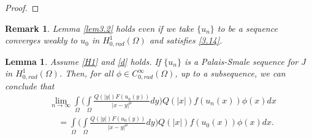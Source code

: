 \documentclass[11pt]{amsart}
\numberwithin{equation}{section}
\newtheorem{lem}[thm]{Lemma}
\newtheorem{rem}{Remark}
\newcommand{\hr}{H^1_{0, rad}(\Omega)}
\newcommand{\1}{\frac{1}{2}}
\begin{document}
\begin{proof}
		
	\end{proof} 
	\begin{rem}
		\label{rem3.1}
		Lemma \ref{lem3.2} holds even if we take $\{u_n\}$ to be a sequence converges weakly to $u_0$ in $\hr$ and satisfies \eqref{3.14}.
	\end{rem}
	\begin{lem}
		\label{lemma3.4}
		Assume \eqref{H1} and \eqref{d} holds. If $\{u_n\}$ is a Palais-Smale sequence for $J$ in $\hr$. Then, for all $\phi \in C^\infty_{0,rad}(\Omega)$, up to a subsequence, we can conclude that
		\begin{align*}
			&\lim_{n \rightarrow \infty} \int\limits_{\Omega} \Bigg( \int\limits_{\Omega} \frac{Q(|y|)F(u_n(y))}{|x-y|^\mu}dy \Bigg) Q(|x|)f(u_n(x)) \phi(x) dx \\
			& \quad= \int\limits_{\Omega} \Bigg( \int\limits_{\Omega} \frac{Q(|y|) F(u_0(y))}{|x-y|^\mu}dy \Bigg) Q(|x|)f(u_0(x)) \phi(x) dx. 
		\end{align*}  
	\end{lem}
\end{document}
